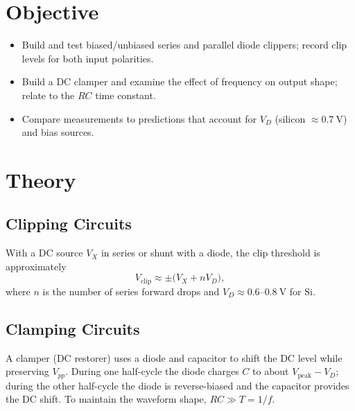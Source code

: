 \documentclass[12pt]{article}
\begin{document}
\section{Objective}
\begin{itemize}
  \item Build and test biased/unbiased series and parallel diode clippers; record clip levels for both input polarities.
  \item Build a DC clamper and examine the effect of frequency on output shape; relate to the \(RC\) time constant.
  \item Compare measurements to predictions that account for \(V_{D}\) (silicon \(\approx 0.7\ \text{V}\)) and bias sources.
\end{itemize}

\section{Theory}
\subsection{Clipping Circuits}
With a DC source \(V_X\) in series or shunt with a diode, the clip threshold is approximately
\[
V_{\text{clip}} \approx \pm\!\big(V_X + n V_D\big),
\]
where \(n\) is the number of series forward drops and \(V_D\approx 0.6\text{–}0.8\ \text{V}\) for Si.

\subsection{Clamping Circuits}
A clamper (DC restorer) uses a diode and capacitor to shift the DC level while preserving \(V_{pp}\). During one half-cycle the diode charges \(C\) to about \(V_\text{peak}-V_D\); during the other half-cycle the diode is reverse-biased and the capacitor provides the DC shift. To maintain the waveform shape, \(RC \gg T=1/f\).
\end{document}
